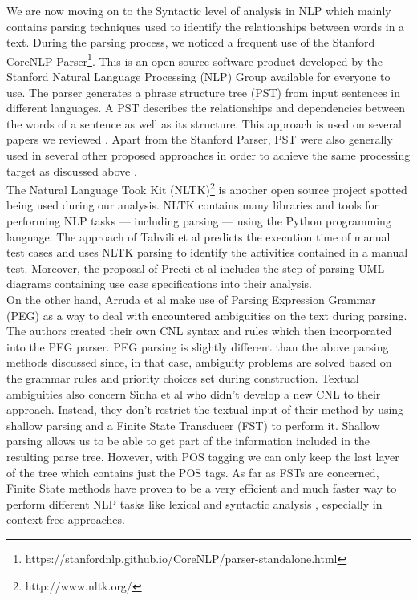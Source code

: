 We are now moving on to the Syntactic level of analysis in NLP which mainly contains parsing techniques used to identify the relationships 
between words in a text. During the parsing process, we noticed a frequent use of the Stanford CoreNLP Parser\footnote{https://stanfordnlp.github.io/CoreNLP/parser-standalone.html}. 
This is an open source software product developed by the Stanford Natural Language Processing (NLP) Group available for everyone to use. The parser generates a phrase structure tree (PST) 
from input sentences in different languages. A PST describes the relationships and dependencies between the words of a sentence as well as its 
structure. This approach is used on several papers we reviewed \cite{soeken2012assisted, rane2017automatic, 9240680}. Apart from the Stanford Parser, 
PST were also generally used in several other proposed approaches in order to achieve the same processing target as discussed above 
\cite{harmain2000cm, mulla2020potent}.\\
The Natural Language Took Kit (NLTK)\footnote{http://www.nltk.org/} is another open source project spotted being used during our analysis. 
NLTK contains many libraries and tools for performing NLP tasks --- including parsing --- using the Python programming language. The approach of 
Tahvili et al \cite{8051381} predicts the execution time of manual test cases and uses NLTK parsing to identify the activities contained in 
a manual test. Moreover, the proposal of Preeti et al \cite{preeti2017building} includes the step of parsing UML diagrams containing use 
case specifications into their analysis.\\
On the other hand, Arruda et al \cite{arruda2020automation} make use of Parsing Expression Grammar (PEG) \cite{ford2004parsing} as a 
way to deal with encountered ambiguities on the text during parsing. The authors created their own CNL syntax and rules which then incorporated 
into the PEG parser. PEG parsing is slightly different than the above parsing methods discussed since, in that case, ambiguity problems are 
solved based on the grammar rules and priority choices set during construction. Textual ambiguities also concern Sinha et al \cite{sinha2009linguistic} 
who didn't develop a new CNL to their approach. Instead, they don't restrict the textual input of their method by using shallow parsing and a 
Finite State Transducer (FST) to perform it. Shallow parsing allows us to be able to get part of the information included in the resulting parse tree. 
However, with POS tagging we can only keep the last layer of the tree which contains just the POS tags. As far as FSTs are concerned, Finite 
State methods have proven to be a very efficient and much faster way to perform different NLP tasks like lexical and syntactic analysis \cite{hobbs1997extracting}, 
especially in context-free approaches.\\

